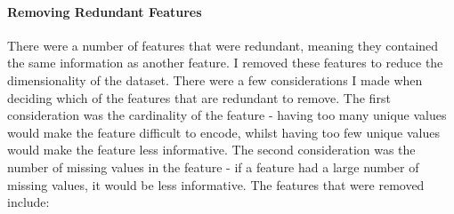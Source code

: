 \documentclass{article}
\begin{document}
\paragraph{Removing Redundant Features}
There were a number of features that were redundant, meaning they contained the same information as another feature. I removed these features to reduce the dimensionality of the dataset. There were a few considerations I made when deciding which of the features that are redundant to remove. The first consideration was the cardinality of the feature - having too many unique values would make the feature difficult to encode, whilst having too few unique values would make the feature less informative. The second consideration was the number of missing values in the feature - if a feature had a large number of missing values, it would be less informative. The features that were removed include:
\end{document}
